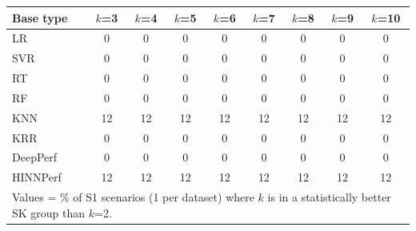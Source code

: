 \begin{tabular}{lcccccccc}
\toprule
Base type & $k$=3 & $k$=4 & $k$=5 & $k$=6 & $k$=7 & $k$=8 & $k$=9 & $k$=10 \\
\midrule
LR & 0 & 0 & 0 & 0 & 0 & 0 & 0 & 0 \\
SVR & 0 & 0 & 0 & 0 & 0 & 0 & 0 & 0 \\
RT & 0 & 0 & 0 & 0 & 0 & 0 & 0 & 0 \\
RF & 0 & 0 & 0 & 0 & 0 & 0 & 0 & 0 \\
KNN & 12 & 12 & 12 & 12 & 12 & 12 & 12 & 12 \\
KRR & 0 & 0 & 0 & 0 & 0 & 0 & 0 & 0 \\
DeepPerf & 0 & 0 & 0 & 0 & 0 & 0 & 0 & 0 \\
HINNPerf & 12 & 12 & 12 & 12 & 12 & 12 & 12 & 12 \\
\bottomrule
\multicolumn{9}{l}{\footnotesize Values = \% of S1 scenarios (1 per dataset) where $k$ is in a statistically better SK group than $k$=2.}} \\
\end{tabular}
